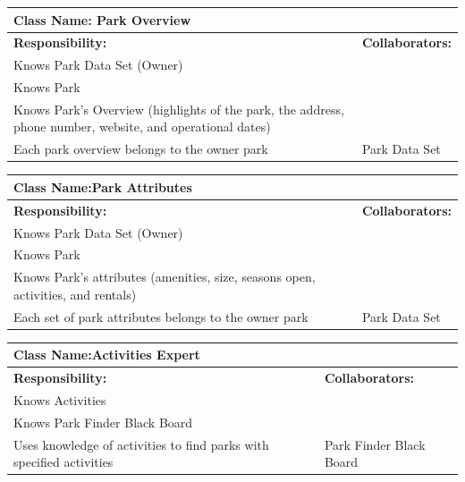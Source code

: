 \documentclass[titlepage,12pt]{article}
\begin{document}
 				\begin{table}[H]
 					\centering
 					\begin{tabular}{|p{5cm}|p{5cm}|}
 						\hline 
 						\multicolumn{2}{|l|}{\textbf{Class Name: Park Overview}} \\
 						\hline
 						\textbf{Responsibility:} & \textbf{Collaborators:} \\
 						\hline
 					    Knows Park Data Set (Owner)& \\
 					    \hline
 					    Knows Park & \\
 					    \hline
 					    Knows Park’s Overview (highlights of the
 					    park, the address, phone number, website, and operational
 					    dates) & \\
 					    \hline
 						Each park overview belongs to the owner park	& Park Data Set\\
 						\hline
 						
 						
 					\end{tabular}
 				\end{table}
 		
 		\begin{table}[H]
 			\centering
 			\begin{tabular}{|p{5cm}|p{5cm}|}
 				\hline 
 				\multicolumn{2}{|l|}{\textbf{Class Name:Park Attributes}} \\
 				\hline
 				\textbf{Responsibility:} & \textbf{Collaborators:} \\
 				\hline
 				Knows Park Data Set (Owner) & \\
 				\hline
 				Knows Park & \\
 				\hline
 				Knows Park’s attributes (amenities, size, seasons open, 
 				activities, and rentals) & \\
 				\hline
 				Each set of park attributes belongs to the owner park &	Park Data Set\\
 				
 				\hline
 				
 			\end{tabular}
 		\end{table}
 		
 		
 				\begin{table}[H]
 					\centering
 					\begin{tabular}{|p{5cm}|p{5cm}|}
 						\hline 
 						\multicolumn{2}{|l|}{\textbf{Class Name:Activities Expert}} \\
 						\hline
 						\textbf{Responsibility:} & \textbf{Collaborators:} \\
 						\hline
 						Knows Activities & \\
 						\hline
 						Knows Park Finder Black Board & \\
 						\hline
 						Uses knowledge of activities to find parks with specified activities &	Park Finder Black Board \\
 						\hline
 					\end{tabular}
 				\end{table}
 		
\end{document}
